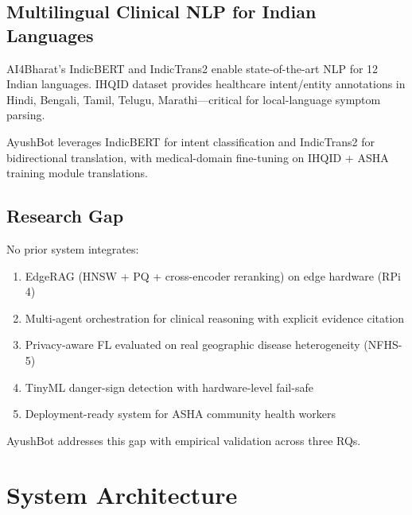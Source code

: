 \documentclass[conference,compsoc]{IEEEtran}
\begin{document}
\subsection{Multilingual Clinical NLP for Indian Languages}

AI4Bharat's IndicBERT \cite{indicbert_ai4bharat} and IndicTrans2 \cite{indictrans2_ai4bharat} enable state-of-the-art NLP for 12 Indian languages. IHQID dataset \cite{ihqid_acl_2023} provides healthcare intent/entity annotations in Hindi, Bengali, Tamil, Telugu, Marathi—critical for local-language symptom parsing.

AyushBot leverages IndicBERT for intent classification and IndicTrans2 for bidirectional translation, with medical-domain fine-tuning on IHQID + ASHA training module translations.

\subsection{Research Gap}

No prior system integrates:
\begin{enumerate}
    \item EdgeRAG (HNSW + PQ + cross-encoder reranking) on edge hardware (RPi 4)
    \item Multi-agent orchestration for clinical reasoning with explicit evidence citation
    \item Privacy-aware FL evaluated on real geographic disease heterogeneity (NFHS-5)
    \item TinyML danger-sign detection with hardware-level fail-safe
    \item Deployment-ready system for ASHA community health workers
\end{enumerate}

AyushBot addresses this gap with empirical validation across three RQs.

\section{System Architecture}
\end{document}
